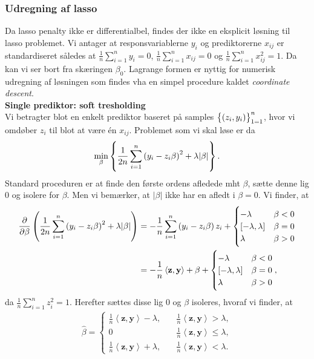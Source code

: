 \subsubsection{Udregning af lasso}
Da lasso penalty ikke er differentialbel, findes der ikke en eksplicit løsning til lasso problemet.
Vi antager at responsvariablerne $y_i$ og prediktorerne $x_{ij}$ er standardiseret således at \(\frac{1}{n} \sum_{i=1}^n y_{i} = 0\), \(\frac{1}{n} \sum_{i=1}^n x_{ij} = 0\) og \(\frac{1}{n} \sum_{i=1}^n x_{ij}^2=1\).
Da kan vi ser bort fra skæringen $\beta_0$.
Lagrange formen er nyttig for numerisk udregning af løsningen som findes vha en simpel procedure kaldet \textit{coordinate descent}. \\
%
\textbf{Single prediktor: soft tresholding} \\
Vi betragter blot en enkelt prediktor baseret på samples $\cbr{\del{z_i, y_i}}_{1=1}^n$, hvor vi omdøber $z_i$ til blot at være én $x_{ij}$.
Problemet som vi skal løse er da
\begin{align*}
\min_{\beta} \cbr{\frac{1}{2n} \sum_{i=1}^n \del{y_i - z_{i} \beta}^2 + \lambda \vert \beta \vert}.
\end{align*}
Standard proceduren er at finde den første ordens afledede mht $\beta$, sætte denne lig 0 og isolere for $\beta$. Men vi bemærker, at \(\vert \beta \vert \) ikke har en afledt i $\beta=0$.
Vi finder, at
\begin{align*}
\frac{\partial}{\partial \beta} \del{\frac{1}{2n} \sum_{i=1}^n \del{y_i - z_{i} \beta}^2 + \lambda \vert \beta \vert}
&= -\frac{1}{n} \sum_{i=1}^n \del{y_i - z_{i} \beta} z_i + \begin{cases}
-\lambda \quad &\beta < 0 \\
[-\lambda, \lambda] & \beta = 0 \\
\lambda & \beta >0 
\end{cases}  \\
&= -\frac{1}{n} \left\langle \mathbf{z}, \mathbf{y} \right\rangle + \beta + \begin{cases}
-\lambda \quad &\beta < 0 \\
[-\lambda, \lambda] & \beta = 0 \\
\lambda & \beta >0 
\end{cases},
\end{align*}
da $\frac{1}{n} \sum_{i=1}^n z_i^2=1$. Herefter sættes disse lig 0 og $\beta$ isoleres, hvoraf vi finder, at
\begin{align*}
\hat{\beta} = \begin{cases}
\frac{1}{n} \left\langle \mathbf{z}, \mathbf{y} \right\rangle - \lambda, \quad &\frac{1}{n} \left\langle \mathbf{z}, \mathbf{y} \right\rangle > \lambda, \\
0 &\frac{1}{n} \left\langle \mathbf{z}, \mathbf{y} \right\rangle \leq \lambda, \\
\frac{1}{n} \left\langle \mathbf{z}, \mathbf{y} \right\rangle + \lambda, &\frac{1}{n} \left\langle \mathbf{z}, \mathbf{y} \right\rangle < \lambda.
\end{cases}
\end{align*}

